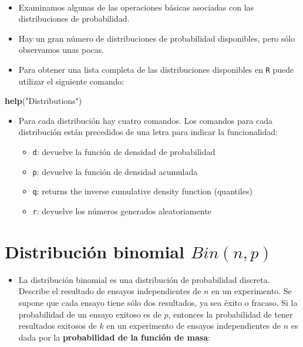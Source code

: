 \documentclass[]{book}
\newenvironment{Shaded}{\begin{snugshade}}{\end{snugshade}}
\newcommand{\KeywordTok}[1]{\textcolor[rgb]{0.13,0.29,0.53}{\textbf{#1}}}
\newcommand{\StringTok}[1]{\textcolor[rgb]{0.31,0.60,0.02}{#1}}
\newcommand{\NormalTok}[1]{#1}
\providecommand{\tightlist}{%
  \setlength{\itemsep}{0pt}\setlength{\parskip}{0pt}}
\begin{document}
~

\begin{itemize}
\item
  Examinamos algunas de las operaciones básicas asociadas con las
  distribuciones de probabilidad.
\item
  Hay un gran número de distribuciones de probabilidad disponibles, pero
  sólo observamos unas pocas.
\item
  Para obtener una lista completa de las distribuciones disponibles en
  \texttt{R} puede utilizar el siguiente comando:
\end{itemize}

\begin{Shaded}
\begin{Highlighting}[]
\KeywordTok{help}\NormalTok{(}\StringTok{"Distributions"}\NormalTok{)}
\end{Highlighting}
\end{Shaded}

\begin{itemize}
\item
  Para cada distribución hay cuatro comandos. Los comandos para cada
  distribución están precedidos de una letra para indicar la
  funcionalidad:

  \begin{itemize}
  \tightlist
  \item
    \texttt{d}: devuelve la función de densidad de probabilidad
  \item
    \texttt{p}: devuelve la función de densidad acumulada
  \item
    \texttt{q}: returns the inverse cumulative density function
    (quantiles)
  \item
    \texttt{r}: devuelve los números generados aleatoriamente
  \end{itemize}
\end{itemize}

\section{\texorpdfstring{Distribución binomial
\(Bin(n,p)\)}{Distribución binomial Bin(n,p)}}\label{distribucion-binomial-binnp}

\begin{itemize}
\tightlist
\item
  La distribución binomial es una distribución de probabilidad discreta.
  Describe el resultado de ensayos independientes de \(n\) en un
  experimento. Se supone que cada ensayo tiene sólo dos resultados, ya
  sea éxito o fracaso. Si la probabilidad de un ensayo exitoso es de
  \(p\), entonces la probabilidad de tener resultados exitosos de \(k\)
  en un experimento de ensayos independientes de \(n\) es dada por la
  \textbf{probabilidad de la función de masa}:
\end{itemize}
\end{document}

